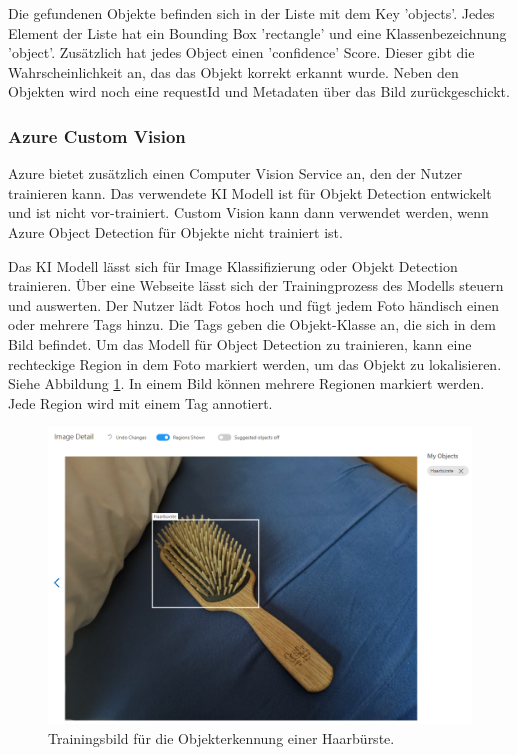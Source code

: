 Die gefundenen Objekte befinden sich in der Liste mit dem Key 'objects'. Jedes Element der Liste hat ein Bounding Box 'rectangle' und eine Klassenbezeichnung 'object'. Zusätzlich hat jedes Object einen 'confidence' Score. Dieser gibt die Wahrscheinlichkeit an, das das Objekt korrekt erkannt wurde. 
Neben den Objekten wird noch eine requestId und Metadaten über das Bild zurückgeschickt.

\subsubsection{Azure Custom Vision}
Azure bietet zusätzlich einen Computer Vision Service an, den der Nutzer trainieren kann. 
Das verwendete KI Modell ist für Objekt Detection entwickelt und ist nicht vor-trainiert.
Custom Vision kann dann verwendet werden, wenn Azure Object Detection für Objekte nicht trainiert ist.\citep{Azure302bDoc}

Das KI Modell lässt sich für Image Klassifizierung oder Objekt Detection trainieren. Über eine Webseite lässt sich der Trainingprozess des Modells steuern und auswerten. Der Nutzer lädt Fotos hoch und fügt jedem Foto händisch einen oder mehrere Tags hinzu. Die Tags geben die Objekt-Klasse an, die sich in dem Bild befindet. Um das Modell für Object Detection zu trainieren, kann eine rechteckige Region in dem Foto markiert werden, um das Objekt zu lokalisieren. Siehe Abbildung \ref{img:trainingone}. In einem Bild können mehrere Regionen markiert werden. Jede Region wird mit einem Tag annotiert.

\begin{figure}[H]
	\centering
	\includegraphics[width=1\textwidth]{images/trainingone.png}
	\caption[]{Trainingsbild für die Objekterkennung einer Haarbürste.}
	\label{img:trainingone}
\end{figure}

